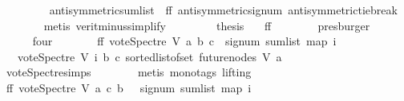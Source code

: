 \begin{isabellebody}
\ \ \ \ \ \ \isamarkupfalse%
\ \ antisymmetric{\isacharunderscore}{\kern0pt}sumlist\ {}\ ff{}\ antisymmetric{\isacharunderscore}{\kern0pt}signum\ antisymmetric{\isacharunderscore}{\kern0pt}tie{\isacharunderscore}{\kern0pt}break\isanewline
\ \ \ \ \ \ \isamarkupfalse%
\ {\isacharparenleft}{\kern0pt}metis\ verit{\isacharunderscore}{\kern0pt}minus{\isacharunderscore}{\kern0pt}simplify{\isacharparenleft}{\kern0pt}{}{\isacharparenright}{\kern0pt}{\isacharparenright}{\kern0pt}\ \isanewline
\ \ \ \ \isamarkupfalse%
\ \isamarkupfalse%
\ {\isacharquery}{\kern0pt}thesis\ \isamarkupfalse%
\ \ ff\isanewline
\ \ \ \ \ \ \isamarkupfalse%
\ presburger\ \isanewline
\ \ \isamarkupfalse%
\isanewline
\ \ \ \ \isamarkupfalse%
\ four\isanewline
\ \ \ \ \isamarkupfalse%
\ \isamarkupfalse%
\ ff{\isacharcolon}{\kern0pt}\ {\isachardoublequoteopen}vote{\isacharunderscore}{\kern0pt}Spectre\ V\ a\ b\ c\ {\isacharequal}{\kern0pt}\ signum\ {\isacharparenleft}{\kern0pt}sum{\isacharunderscore}{\kern0pt}list\ {\isacharparenleft}{\kern0pt}map\ {\isacharparenleft}{\kern0pt}{\isasymlambda}i{\isachardot}{\kern0pt}\isanewline
\ \ \ {\isacharparenleft}{\kern0pt}vote{\isacharunderscore}{\kern0pt}Spectre\ V\ i\ b\ c{\isacharparenright}{\kern0pt}{\isacharparenright}{\kern0pt}\ {\isacharparenleft}{\kern0pt}sorted{\isacharunderscore}{\kern0pt}list{\isacharunderscore}{\kern0pt}of{\isacharunderscore}{\kern0pt}set\ {\isacharparenleft}{\kern0pt}future{\isacharunderscore}{\kern0pt}nodes\ V\ a{\isacharparenright}{\kern0pt}{\isacharparenright}{\kern0pt}{\isacharparenright}{\kern0pt}{\isacharparenright}{\kern0pt}{\isachardoublequoteclose}\isanewline
\ \ \ \ \ \ \isamarkupfalse%
\ vote{\isacharunderscore}{\kern0pt}Spectre{\isachardot}{\kern0pt}simps\isanewline
\ \ \ \ \ \ \isamarkupfalse%
\ {\isacharparenleft}{\kern0pt}metis\ {\isacharparenleft}{\kern0pt}mono{\isacharunderscore}{\kern0pt}tags{\isacharcomma}{\kern0pt}\ lifting{\isacharparenright}{\kern0pt}{\isacharparenright}{\kern0pt}\ \isanewline
\ \ \ \ \isamarkupfalse%
\ \isamarkupfalse%
\ ff{}{\isacharcolon}{\kern0pt}\ {\isachardoublequoteopen}vote{\isacharunderscore}{\kern0pt}Spectre\ V\ a\ c\ b\ {\isacharequal}{\kern0pt}\ \ signum\ {\isacharparenleft}{\kern0pt}sum{\isacharunderscore}{\kern0pt}list\ {\isacharparenleft}{\kern0pt}map\ {\isacharparenleft}{\kern0pt}{\isasymlambda}i{\isachardot}{\kern0pt}\isanewline

\end{isabellebody}

